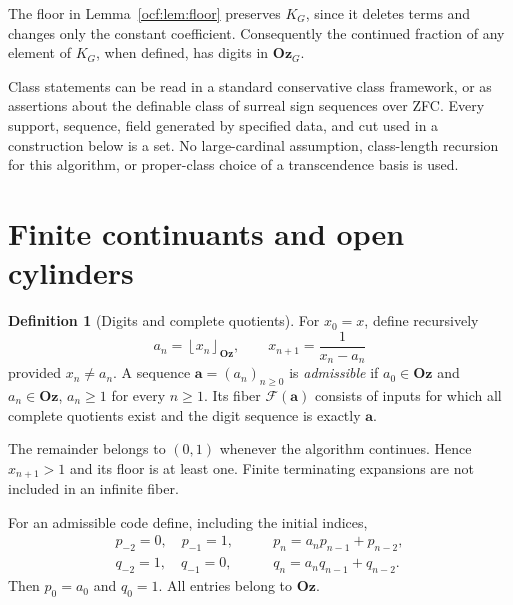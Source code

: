 \documentclass[11pt,a4paper]{article}
\numberwithin{equation}{section}
\theoremstyle{definition}
\newtheorem{definition}[theorem]{Definition}
\theoremstyle{remark}
\newcommand{\Oz}{\mathbf{Oz}}
\newcommand{\F}{\mathcal F}
\newcommand{\fl}[1]{\left\lfloor#1\right\rfloor_{\Oz}}
\newcommand{\codea}{\boldsymbol a}
\begin{document}
The floor in Lemma~\ref{ocf:lem:floor} preserves $K_G$, since it deletes terms
and changes only the constant coefficient. Consequently the continued
fraction of any element of $K_G$, when defined, has digits in $\Oz_G$.

Class statements can be read in a standard conservative class framework,
or as assertions about the definable class of surreal sign sequences over
ZFC. Every support, sequence, field generated by specified data, and cut
used in a construction below is a set. No large-cardinal assumption,
class-length recursion for this algorithm, or proper-class choice of a
transcendence basis is used.

\section{Finite continuants and open cylinders}
\label{ocf:sec:cylinders}

\begin{definition}[Digits and complete quotients]\label{ocf:def:digits}
For $x_0=x$, define recursively
\[
 a_n=\fl{x_n},\qquad x_{n+1}=\frac1{x_n-a_n}
\]
provided $x_n\ne a_n$. A sequence $\codea=(a_n)_{n\ge0}$ is
\emph{admissible} if $a_0\in\Oz$ and $a_n\in\Oz$, $a_n\ge1$ for every
$n\ge1$. Its fiber $\F(\codea)$ consists of inputs for which all complete
quotients exist and the digit sequence is exactly $\codea$.
\end{definition}

The remainder belongs to $(0,1)$ whenever the algorithm continues. Hence
$x_{n+1}>1$ and its floor is at least one. Finite terminating expansions
are not included in an infinite fiber.

For an admissible code define, including the initial indices,
\begin{align}\label{ocf:eq:continuants}
 p_{-2}=0,\quad p_{-1}=1,&\qquad
 p_n=a_np_{n-1}+p_{n-2},\\
 q_{-2}=1,\quad q_{-1}=0,&\qquad
 q_n=a_nq_{n-1}+q_{n-2}.\nonumber
\end{align}
Then $p_0=a_0$ and $q_0=1$. All entries belong to $\Oz$.
\end{document}
